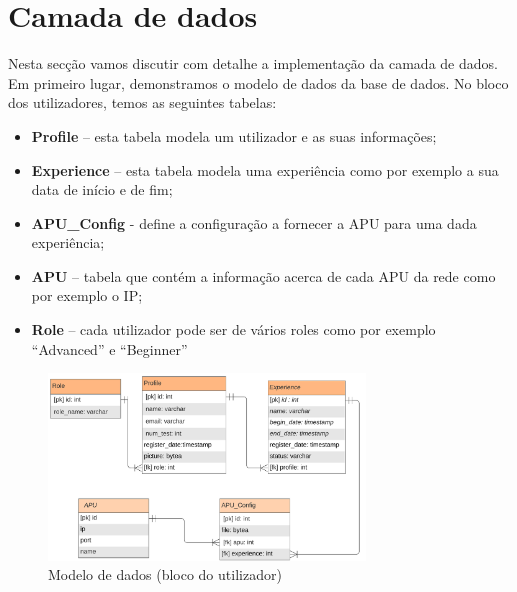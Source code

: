 \section{Camada de dados}
Nesta secção vamos discutir com detalhe a implementação da camada de dados. Em primeiro lugar, demonstramos o modelo de dados da base de dados.\newline
No bloco dos utilizadores, temos as seguintes tabelas:
\begin{itemize}
    \item \textbf{Profile} – esta tabela modela um utilizador e as suas informações;
    \item \textbf{Experience} – esta tabela modela uma experiência como por exemplo a sua data de início e de fim;
    \item \textbf{APU\_Config} - define a configuração a fornecer a APU para uma dada experiência;
    \item \textbf{APU} – tabela que contém a informação acerca de cada APU da rede como por exemplo o IP;
    \item \textbf{Role} – cada utilizador pode ser de vários roles como por exemplo “Advanced” e “Beginner”
\end{itemize}
\begin{figure}[!ht]
    \centering
    \includegraphics[width=0.75\textwidth, height=0.347\textheight]{images/data_model.png}
    \caption{Modelo de dados (bloco do utilizador)}
    \label{fig:dataModel}
\end{figure}
